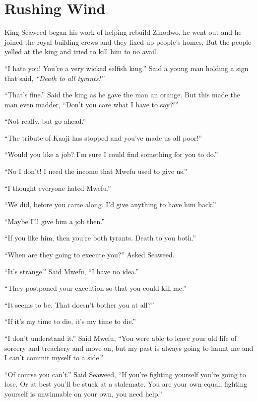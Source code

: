 \section{Rushing Wind}

King Seaweed began his work of helping rebuild Zinodwo, he went out and he joined the royal building crews and they fixed up people's homes. But the people yelled at the king and tried to kill him to no avail.

``I hate you! You're a very wicked selfish king.''
Said a young man holding a sign that said, \emph{``Death to all tyrants!''}

``That's fine.'' Said the king as he gave the man an orange. But this made the man even madder, ``Don't you care what I have to say?!''

``Not really, but go ahead.''

``The tribute of Kaaji has stopped and you've made us all poor!''

``Would you like a job? I'm sure I could find something for you to do.''

``No I don't! I need the income that Mwefu used to give us.''

``I thought everyone hated Mwefu.''

``We did, before you came along. I'd give anything to have him back.''

``Maybe I'll give him a job then.''

``If you like him, then you're both tyrants. Death to you both.''

\tbreak

``When are they going to execute you?'' Asked Seaweed.

``It's strange.'' Said Mwe\-fu, ``I have no idea.''

``They postponed your execution so that you could kill me.''

``It seems to be. That doesn't bother you at all?''

``If it's my time to die, it's my time to die.''

``I don't understand it.'' Said Mwe\-fu, ``You were able to leave your old life of sorcery and treachery and move on, but my past is always going to haunt me and I can't commit myself to a side.''

``Of course you can't.'' Said Seaweed, ``If you're fighting yourself you're going to lose. Or at best you'll be stuck at a stalemate. You are your own equal, fighting yourself is unwinnable on your own, you need help.''

